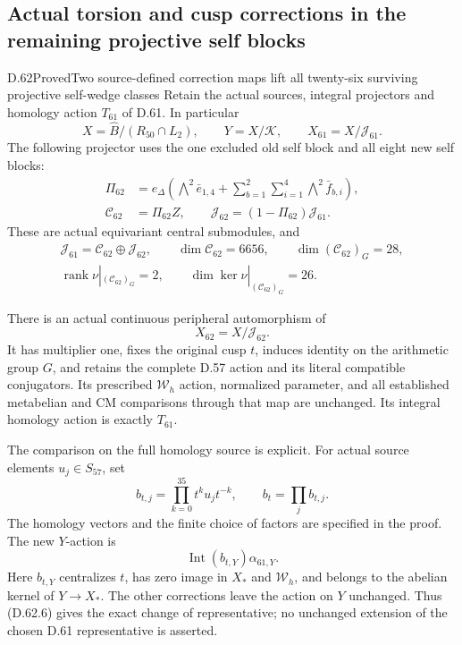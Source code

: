 \subsection{Actual torsion and cusp corrections in the remaining projective self blocks}

\begin{statement}{D.62}{Proved}{Two source-defined correction maps lift all twenty-six surviving projective self-wedge classes}
Retain the actual sources, integral projectors and
homology action \(T_{61}\) of D.61. In particular
\[
 X=\widehat B/(R_{50}\cap L_2),\qquad
 Y=X/\mathcal K,\qquad
 X_{61}=X/\mathcal J_{61}.
 \tag{D.62.1}
\]
The following projector uses the one excluded
old self block and all eight new self blocks:
\[
 \begin{aligned}
 \Pi_{62}&=e_\Delta\left(
       \bigwedge\nolimits^2\bar e_{1,4}
          +\sum_{b=1}^{2}\sum_{i=1}^{4}
                    \bigwedge\nolimits^2\bar f_{b,i}\right),\\
 \mathcal C_{62}&=\Pi_{62}Z,\qquad
 \mathcal J_{62}=(1-\Pi_{62})\mathcal J_{61}.
 \end{aligned}
 \tag{D.62.2}
\]
These are actual equivariant central submodules,
and
\[
 \begin{gathered}
 \mathcal J_{61}=\mathcal C_{62}\oplus\mathcal J_{62},
 \qquad\dim\mathcal C_{62}=6656,\qquad
 \dim(\mathcal C_{62})_G=28,\\
 \operatorname{rank}\nu|_{(\mathcal C_{62})_G}=2,
 \qquad\dim\ker\nu|_{(\mathcal C_{62})_G}=26.
 \end{gathered}
 \tag{D.62.3}
\]

There is an actual continuous peripheral
automorphism of
\[
                         X_{62}=X/\mathcal J_{62}.
 \tag{D.62.4}
\]
It has multiplier one, fixes the original cusp
\(t\), induces identity on the arithmetic group
\(G\), and retains the complete D.57 action
and its literal compatible conjugators.
Its prescribed \(\mathcal W_h\) action,
normalized parameter, and all established
metabelian and CM comparisons through that
map are unchanged. Its integral homology
action is exactly \(T_{61}\).

The comparison on the full homology source
is explicit. For actual source elements
\(u_j\in S_{57}\), set
\[
 b_{t,j}=\prod_{k=0}^{35}t^k u_jt^{-k},
 \qquad b_t=\prod_j b_{t,j}.
 \tag{D.62.5}
\]
The homology vectors and the finite choice
of factors are specified in the proof.
The new \(Y\)-action is
\[
                 \operatorname{Int}(b_{t,Y})\alpha_{61,Y}.
 \tag{D.62.6}
\]
Here \(b_{t,Y}\) centralizes \(t\),
has zero image in \(X_*\) and
\(\mathcal W_h\), and belongs to the
abelian kernel of \(Y\to X_*\).
The other corrections leave the action
on \(Y\) unchanged. Thus (D.62.6)
gives the exact change of representative;
no unchanged extension of the chosen
D.61 representative is asserted.


\end{statement}
